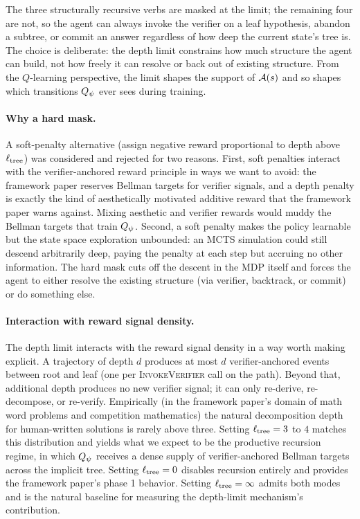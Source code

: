 The three structurally recursive verbs are masked at the limit; the
remaining four are not, so the agent can always invoke the verifier on a
leaf hypothesis, abandon a subtree, or commit an answer regardless of
how deep the current state's tree is. The choice is deliberate: the
depth limit constrains how much structure the agent can build, not how
freely it can resolve or back out of existing structure. From the
$Q$-learning perspective, the limit shapes the support of $\mathcal{A}(s)$
and so shapes which transitions $Q_{\psi}$ ever sees during training.

\paragraph{Why a hard mask.}
A soft-penalty alternative (assign negative reward proportional to depth
above $\ell_{\mathrm{tree}}$) was considered and rejected for two reasons. First,
soft penalties interact with the verifier-anchored reward principle in
ways we want to avoid: the framework paper reserves Bellman targets for
verifier signals, and a depth penalty is exactly the kind of
aesthetically motivated additive reward that the framework paper warns
against. Mixing aesthetic and verifier rewards would muddy the Bellman
targets that train $Q_{\psi}$. Second, a soft penalty makes the policy
learnable but the state space exploration unbounded: an MCTS simulation
could still descend arbitrarily deep, paying the penalty at each step
but accruing no other information. The hard mask cuts off the descent
in the MDP itself and forces the agent to either resolve the existing
structure (via verifier, backtrack, or commit) or do something else.

\paragraph{Interaction with reward signal density.}
The depth limit interacts with the reward signal density in a way worth
making explicit. A trajectory of depth $d$ produces at most $d$
verifier-anchored events between root and leaf (one per
\textsc{InvokeVerifier} call on the path). Beyond that, additional
depth produces no new verifier signal; it can only re-derive,
re-decompose, or re-verify. Empirically (in the framework paper's
domain of math word problems and competition mathematics) the natural
decomposition depth for human-written solutions is rarely above three.
Setting $\ell_{\mathrm{tree}} = 3$ to $4$ matches this distribution and yields what
we expect to be the productive recursion regime, in which $Q_{\psi}$
receives a dense supply of verifier-anchored Bellman targets across the
implicit tree. Setting $\ell_{\mathrm{tree}} = 0$ disables recursion entirely and
provides the framework paper's phase 1 behavior. Setting
$\ell_{\mathrm{tree}} = \infty$ admits both modes and is the natural baseline for
measuring the depth-limit mechanism's contribution.

